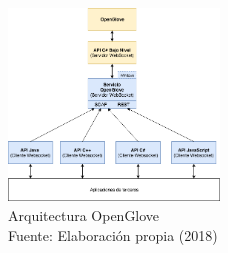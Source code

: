   \begin{figure}[H]
  \begin{center} 
   	\includegraphics[width=0.5\textwidth]{images/chapter01/Legacy-OpenGlove-Architecture-02.png} 
    \caption[Arquitectura OpenGlove]{Arquitectura OpenGlove \\Fuente: Elaboración propia (2018)}
    \label{fig:arquitectura-open-glove}
  \end{center}
\end{figure}

